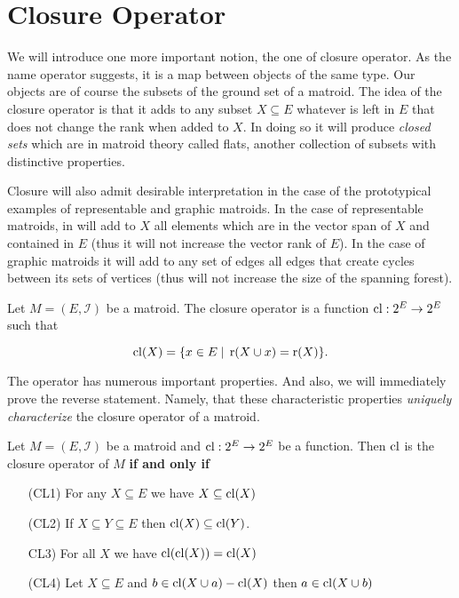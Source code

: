 \section{Closure Operator}


We will introduce one more important notion, the one of closure operator. As the name operator suggests, it is a map between objects of the same type. Our objects are of course the subsets of the ground set of a matroid. The idea of the closure operator is that it adds to any subset $X \subseteq E$ whatever is left in $E$ that does not change the rank when added to $X$. In doing so it will produce \textit{closed sets} which are in matroid theory called flats, another collection of subsets with distinctive properties. 

Closure will also admit desirable interpretation in the case of the prototypical examples of representable and graphic matroids. In the case of representable matroids, in will add to $X$ all elements which are in the vector span of $X$ and contained in $E$ (thus it will not increase the vector rank of $E$). In the case of graphic matroids it will add to any set of edges all edges that create cycles between its sets of vertices (thus will not increase the size of the spanning forest).

\begin{defn}
    Let $M = (E, \mathcal{I})$ be a matroid. The closure operator is a function $\mathrm{cl}: 2^E \to 2^E$ such that

    $$\mathrm{cl}(X) = \{x \in E\; | \; \operatorname{r}(X \cup x) = \operatorname{r}(X) \}.$$

    
\end{defn}

The operator has numerous important properties. And also, we will immediately prove the reverse statement. Namely, that these characteristic properties \textit{uniquely characterize} the closure operator of a matroid.

\begin{theorem}
Let $M = (E, \mathcal{I})$ be a matroid and $\mathrm{cl}: 2^E \to 2^E$ be a function. Then $\mathrm{cl}$ is the closure operator of $M$ \textbf{if and only if}

\begin{enumerate}
    \item[(CL1)] For any $X \subseteq E$ we have $X \subseteq \mathrm{cl} (X)$
    \item[(CL2)] If $X \subseteq Y \subseteq E$ then $\mathrm{cl}(X) \subseteq \mathrm{cl}(Y)$.
    \item[CL3)] For all $X$ we have $\mathrm{cl}(\mathrm{cl}(X)) = \mathrm{cl}(X)$

    \item[(CL4)] Let $X \subseteq E$ and $b \in 
    \mathrm{cl}(X \cup a) - \mathrm{cl}(X)$ then $a \in \mathrm{cl}(X \cup b)$
\end{enumerate}
\end{theorem}


